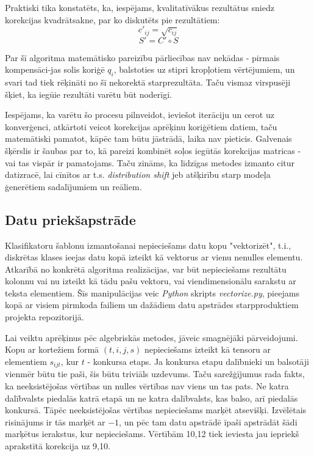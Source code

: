 \documentclass[12pt, a4paper]{article}
\begin{document}
Praktiski tika konstatēts, ka, iespējams, kvalitatīvākus rezultātus sniedz korekcijas kvadrātsakne, par ko diskutēts pie rezultātiem:
\begin{equation}
    c'_{ij} = \sqrt{c_{ij}}
\end{equation}
\begin{equation}
    S' = C' \circ S
\end{equation}


Par šī algoritma matemātisko pareizību pārliecības nav nekādas - pirmais kompensāci-jas solis koriģē $q_i$, balstoties uz stipri kropļotiem vērtējumiem, un svari tad tiek rēķināti no šī nekorektā starprezultāta. Taču vismaz virspusēji šķiet, ka iegūie rezultāti varētu būt noderīgi. 

Iespējams, ka varētu šo procesu pilnveidot, ieviešot iterāciju un cerot uz konverģenci, atkārtoti veicot korekcijas aprēķinu koriģētiem datiem, taču matemātiski pamatot, kāpēc tam būtu jāstrādā, laika nav pieticis. Galvenais šķērslis ir šaubas par to, kā pareizi kombinēt soļos iegūtās korekcijas matricas - vai tas vispār ir pamatojams. Taču zināms, ka līdzīgas metodes izmanto citur datizracē, lai cīnītos ar t.s. \textit{distribution shift} jeb atšķirību starp modeļa ģenerētiem sadalījumiem un reāliem.

\subsection{Datu priekšapstrāde}

Klasifikatoru šablonu izmantošanai nepieciešams datu kopu "vektorizēt", t.i., diskrētas klases ieejas datu kopā izteikt kā vektorus ar vienu nenulles elementu. Atkarībā no konkrētā algoritma realizācijas, var būt nepieciešams rezultātu kolonnu vai nu izteikt kā tādu pašu vektoru, vai viendimensionālu sarakstu ar teksta elementiem. Šīs manipulācijas veic \textit{Python} skripts \textit{vectorize.py}, pieejams kopā ar visiem pirmkoda failiem un dažādiem datu apstrādes starpproduktiem projekta repozitorijā.

Lai veiktu aprēķinus pēc algebriskās metodes, jāveic smagnējāki pārveidojumi. Kopu ar kortežiem formā $(t,i,j,s)$ nepieciešams izteikt kā tensoru ar elementiem $s_{ijt}$, kur $t$ - konkursa etaps. Ja konkursa etapu dalībnieki un balsotāji vienmēr būtu tie paši, šis būtu triviāls uzdevums. Taču sarežģījumus rada fakts, ka neeksistējošas vērtības un nulles vērtības nav viens un tas pats. Ne katra dalībvalsts piedalās katrā etapā un ne katra dalībvalsts, kas balso, arī piedalās konkursā. Tāpēc neeksistējošas vērtības nepieciešams marķēt atsevišķi. Izvēlētais risinājums ir tās marķēt ar $-1$, un pēc tam datu apstrādē īpaši apstrādāt šādi marķētus ierakstus, kur nepieciešams. Vērtībām 10,12 tiek ieviesta jau iepriekš aprakstītā korekcija uz 9,10.
\end{document}
